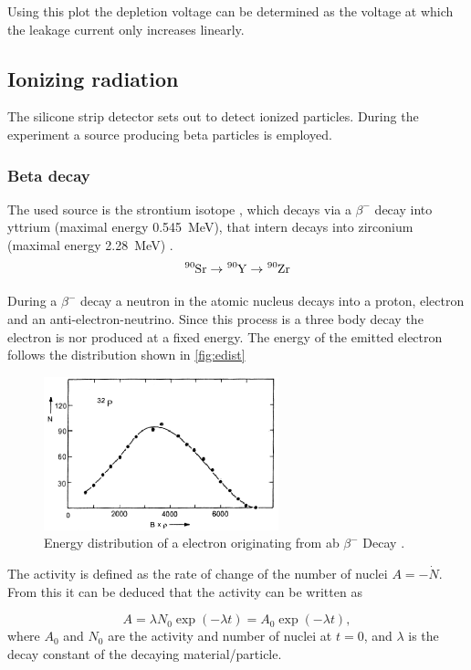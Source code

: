Using this plot the depletion voltage can be determined as the voltage at which the leakage current only increases linearly.

\subsection{Ionizing radiation}
The silicone strip detector sets out to detect ionized particles. During the experiment a source producing beta particles is employed.
\subsubsection{Beta decay}
The used source is the strontium isotope , which decays via a $\beta^-$ decay into yttrium (maximal energy \qty{0.545}{\mega\eV}), that intern decays into zirconium (maximal energy \qty{2.28}{\mega\eV}) \cite{V15}.
\begin{equation}
	\ce{^{90}Sr} \rightarrow \ce{^{90}Y} \rightarrow \ce{^{90}Zr}
\end{equation}

During a $\beta^-$ decay a neutron in the atomic nucleus decays into a proton, electron and an anti-electron-neutrino. Since this process is a three body decay the electron is nor produced at a fixed energy. The energy of the emitted electron follows the distribution shown in \autoref{fig:edist}


\begin{figure}[H]
	\centering
	\includegraphics[width=0.7\linewidth]{Assets/edist.png}
	\caption{Energy distribution of a electron originating from ab $\beta^-$ Decay \cite{V15}.}
	\label{fig:edist}
\end{figure}

The activity is defined as the rate of change of the number of nuclei $A = - \dot{N}$. From this it can be deduced that the activity can be written as

\begin{equation}
	A = \lambda N_0 \exp(-\lambda t) = A_0 \exp(-\lambda t),
\end{equation}
where $A_0$ and $N_0$ are the activity and number of nuclei at $t=0$, and $\lambda$ is the decay constant of the decaying material/particle.

